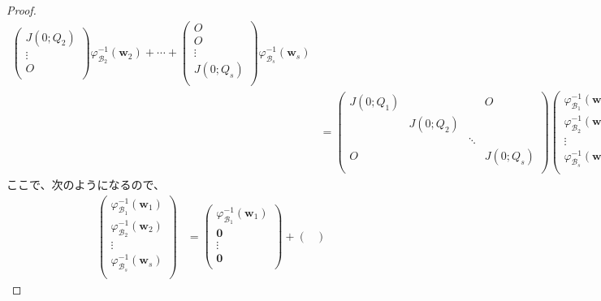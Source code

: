 \documentclass[dvipdfmx]{jsarticle}
\begin{document}
\begin{proof}
\begin{align*}
\begin{pmatrix}
J\left( 0;Q_{2} \right) \\
 \vdots \\
O \\
\end{pmatrix}\varphi_{\mathcal{B}_{2}}^{- 1}\left( \mathbf{w}_{2} \right) + \cdots + \begin{pmatrix}
O \\
O \\
 \vdots \\
J\left( 0;Q_{s} \right) \\
\end{pmatrix}\varphi_{\mathcal{B}_{s}}^{- 1}\left( \mathbf{w}_{s} \right) \\
&= \begin{pmatrix}
J\left( 0;Q_{1} \right) & \  & \  & O \\
\  & J\left( 0;Q_{2} \right) & \  & \  \\
\  & \  & \ddots & \  \\
O & \  & \  & J\left( 0;Q_{s} \right) \\
\end{pmatrix}\begin{pmatrix}
\varphi_{\mathcal{B}_{1}}^{- 1}\left( \mathbf{w}_{1} \right) \\
\varphi_{\mathcal{B}_{2}}^{- 1}\left( \mathbf{w}_{2} \right) \\
 \vdots \\
\varphi_{\mathcal{B}_{s}}^{- 1}\left( \mathbf{w}_{s} \right) \\
\end{pmatrix}
\end{align*}
ここで、次のようになるので、
\begin{align*}
\begin{pmatrix}
\varphi_{\mathcal{B}_{1}}^{- 1}\left( \mathbf{w}_{1} \right) \\
\varphi_{\mathcal{B}_{2}}^{- 1}\left( \mathbf{w}_{2} \right) \\
 \vdots \\
\varphi_{\mathcal{B}_{s}}^{- 1}\left( \mathbf{w}_{s} \right) \\
\end{pmatrix} &= \begin{pmatrix}
\varphi_{\mathcal{B}_{1}}^{- 1}\left( \mathbf{w}_{1} \right) \\
\mathbf{0} \\
 \vdots \\
\mathbf{0} \\
\end{pmatrix} + \begin{pmatrix}

\end{pmatrix}
\end{align*}
\end{proof}
\end{document}

